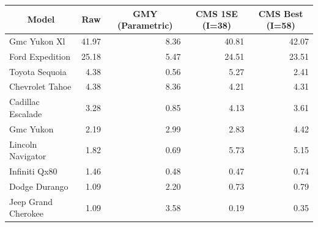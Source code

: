 \centering
\begin{tabular}{lrrrr}
\toprule
\multicolumn{1}{c}{\textbf{Model}} &\multicolumn{1}{c}{\textbf{Raw}} &\multicolumn{1}{c}{\textbf{GMY (Parametric)}} &\multicolumn{1}{c}{\textbf{CMS 1SE (I=38)}} &\multicolumn{1}{c}{\textbf{CMS Best (I=58)}} \\ \midrule
Gmc Yukon Xl & 41.97 & 8.36 & 40.81 & 42.07 \\
Ford Expedition & 25.18 & 5.47 & 24.51 & 23.51 \\
Toyota Sequoia & 4.38 & 0.56 & 5.27 & 2.41 \\
Chevrolet Tahoe & 4.38 & 8.36 & 4.21 & 4.31 \\
Cadillac Escalade & 3.28 & 0.85 & 4.13 & 3.61 \\
Gmc Yukon & 2.19 & 2.99 & 2.83 & 4.42 \\
Lincoln Navigator & 1.82 & 0.69 & 5.73 & 5.15 \\
Infiniti Qx80 & 1.46 & 0.48 & 0.47 & 0.74 \\
Dodge Durango & 1.09 & 2.20 & 0.73 & 0.79 \\
Jeep Grand Cherokee & 1.09 & 3.58 & 0.19 & 0.35 \\
\bottomrule
\end{tabular}
